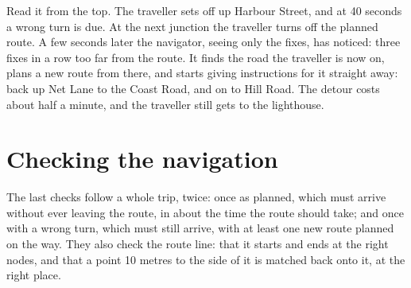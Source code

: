 Read it from the top. The traveller sets off up Harbour Street, and at 40
seconds a wrong turn is due. At the next junction the traveller turns off
the planned route. A few seconds later the navigator, seeing only the fixes,
has noticed: three fixes in a row too far from the route. It finds the road
the traveller is now on, plans a new route from there, and starts giving
instructions for it straight away: back up Net Lane to the Coast Road, and
on to Hill Road. The detour costs about half a minute, and the traveller
still gets to the lighthouse.

\section{Checking the navigation}

The last checks follow a whole trip, twice: once as planned, which must
arrive without ever leaving the route, in about the time the route should
take; and once with a wrong turn, which must still arrive, with at least
one new route planned on the way. They also check the route line: that it
starts and ends at the right nodes, and that a point 10 metres to the side
of it is matched back onto it, at the right place.

